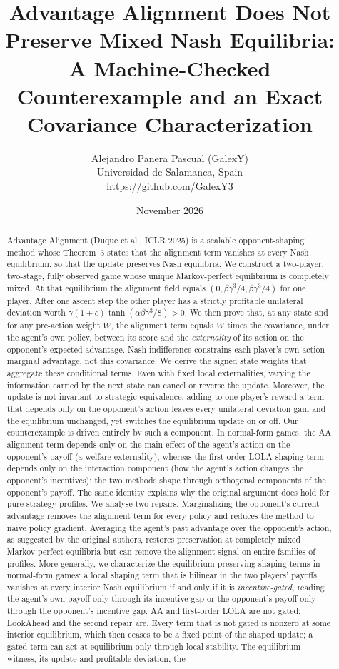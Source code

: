 \documentclass[11pt]{article}
\title{Advantage Alignment Does Not Preserve Mixed Nash Equilibria:\\
A Machine-Checked Counterexample and an Exact Covariance Characterization}
\author{Alejandro Panera Pascual (GalexY)\\ \small Universidad de Salamanca, Spain\\ \small \url{https://github.com/GalexY3}}
\date{November 2026}
\theoremstyle{remark}
\begin{document}
\maketitle

\begin{abstract}
Advantage Alignment (Duque et al., ICLR 2025) is a scalable opponent-shaping method whose Theorem~3 states that the alignment term vanishes at every Nash equilibrium, so that the update preserves Nash equilibria. We construct a two-player, two-stage, fully observed game whose unique Markov-perfect equilibrium is completely mixed. At that equilibrium the alignment field equals $(0,\beta\gamma^3/4,\beta\gamma^3/4)$ for one player. After one ascent step the other player has a strictly profitable unilateral deviation worth $\gamma(1+c)\tanh(\alpha\beta\gamma^3/8)>0$. We then prove that, at any state and for any pre-action weight $W$, the alignment term equals $W$ times the covariance, under the agent's own policy, between its score and the \emph{externality} of its action on the opponent's expected advantage. Nash indifference constrains each player's own-action marginal advantage, not this covariance. We derive the signed state weights that aggregate these conditional terms. Even with fixed local externalities, varying the information carried by the next state can cancel or reverse the update. Moreover, the update is not invariant to strategic equivalence: adding to one player's reward a term that depends only on the opponent's action leaves every unilateral deviation gain and the equilibrium unchanged, yet switches the equilibrium update on or off. Our counterexample is driven entirely by such a component. In normal-form games, the AA alignment term depends only on the main effect of the agent's action on the opponent's payoff (a welfare externality), whereas the first-order LOLA shaping term depends only on the interaction component (how the agent's action changes the opponent's incentives): the two methods shape through orthogonal components of the opponent's payoff. The same identity explains why the original argument does hold for pure-strategy profiles. We analyse two repairs. Marginalizing the opponent's current advantage removes the alignment term for every policy and reduces the method to naive policy gradient. Averaging the agent's past advantage over the opponent's action, as suggested by the original authors, restores preservation at completely mixed Markov-perfect equilibria but can remove the alignment signal on entire families of profiles. More generally, we characterize the equilibrium-preserving shaping terms in normal-form games: a local shaping term that is bilinear in the two players' payoffs vanishes at every interior Nash equilibrium if and only if it is \emph{incentive-gated}, reading the agent's own payoff only through its incentive gap or the opponent's payoff only through the opponent's incentive gap. AA and first-order LOLA are not gated; LookAhead and the second repair are. Every term that is not gated is nonzero at some interior equilibrium, which then ceases to be a fixed point of the shaped update; a gated term can act at equilibrium only through local stability. The equilibrium witness, its update and profitable deviation, the 
\end{abstract}
\end{document}
